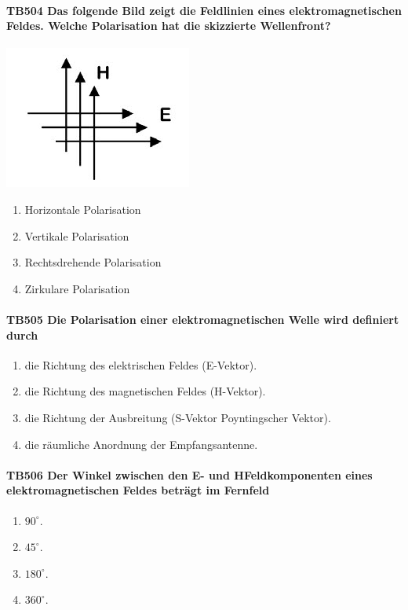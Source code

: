 \documentclass[8pt]{article}
\begin{document}
\begin{enumerate}
\paragraph*{TB504 Das folgende Bild zeigt die Feldlinien eines elektromagnetischen Feldes. Welche Polarisation hat die skizzierte Wellenfront?}
\begin{center}
	\begin{minipage}{\linewidth}
		\centering
		\includegraphics[scale=0.7]{pics/tb504_a.jpg}
	\end{minipage}
\end{center}
\begin{enumerate}[nolistsep,label=\Alph*]
\item Horizontale Polarisation
\item Vertikale Polarisation
\item Rechtsdrehende Polarisation
\item Zirkulare Polarisation
\end{enumerate}



\paragraph*{TB505 Die Polarisation einer elektromagnetischen Welle wird definiert durch}
\begin{enumerate}[nolistsep,label=\Alph*]
\item die Richtung des elektrischen Feldes (E-Vektor).
\item die Richtung des magnetischen Feldes (H-Vektor).
\item die Richtung der Ausbreitung (S-Vektor Poyntingscher Vektor).
\item die räumliche Anordnung der Empfangsantenne.
\end{enumerate}



\paragraph*{TB506 Der Winkel zwischen den E- und HFeldkomponenten eines elektromagnetischen Feldes beträgt im Fernfeld}
\begin{enumerate}[nolistsep,label=\Alph*]
\item $90^{\circ}$.
\item $45^{\circ}$.
\item $180^{\circ}$.
\item $360^{\circ}$.
\end{enumerate}




\end{enumerate}
\end{document}
